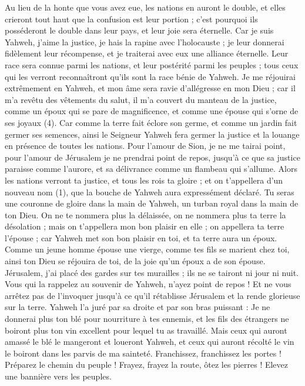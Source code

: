 \begin{multicols}{2}
Au lieu de la honte que vous avez eue, les nations en auront le double, et elles crieront tout haut que la confusion est leur portion ; c'est pourquoi ils posséderont le double dans leur pays, et leur joie sera éternelle.
Car je suis Yahweh, j’aime la justice, je hais la rapine avec l'holocauste ; je leur donnerai fidèlement leur récompense, et je traiterai avec eux une alliance éternelle.
Leur race sera connue parmi les nations, et leur postérité parmi les peuples ; tous ceux qui les verront reconnaîtront qu'ils sont la race bénie de Yahweh.
Je me réjouirai extrêmement en Yahweh, et mon âme sera ravie d’allégresse en mon Dieu ; car il m'a revêtu des vêtements du salut, il m'a couvert du manteau de la justice, comme un époux qui se pare de magnificence, et comme une épouse qui s'orne de ses joyaux (4).
Car comme la terre fait éclore son germe, et comme un jardin fait germer ses semences, ainsi le Seigneur Yahweh fera germer la justice et la louange en présence de toutes les nations.
\VerseOne{}Pour l'amour de Sion, je ne me tairai point, pour l'amour de Jérusalem je ne prendrai point de repos, jusqu’à ce que sa justice paraisse comme l’aurore, et sa délivrance comme un flambeau qui s’allume.
Alors les nations verront ta justice, et tous les rois ta gloire ; et on t'appellera d'un nouveau nom (1), que la bouche de Yahweh aura expressément déclaré.
Tu seras une couronne de gloire dans la main de Yahweh, un turban royal dans la main de ton Dieu.
On ne te nommera plus la délaissée, on ne nommera plus ta terre la désolation ; mais on t'appellera mon bon plaisir en elle ; on appellera ta terre l’épouse ; car Yahweh met son bon plaisir en toi, et ta terre aura un époux.
Comme un jeune homme épouse une vierge, comme tes fils se marient chez toi, ainsi ton Dieu se réjouira de toi, de la joie qu'un époux a de son épouse.
Jérusalem, j'ai placé des gardes sur tes murailles ; ils ne se tairont ni jour ni nuit. Vous qui la rappelez au souvenir de Yahweh, n’ayez point de repos !
Et ne vous arrêtez pas de l'invoquer jusqu’à ce qu'il rétablisse Jérusalem et la rende glorieuse sur la terre.
Yahweh l’a juré par sa droite et par son bras puissant : Je ne donnerai plus ton blé pour nourriture à tes ennemis, et les fils des étrangers ne boiront plus ton vin excellent pour lequel tu as travaillé.
Mais ceux qui auront amassé le blé le mangeront et loueront Yahweh, et ceux qui auront récolté le vin le boiront dans les parvis de ma sainteté.
Franchissez, franchissez les portes ! Préparez le chemin du peuple ! Frayez, frayez la route, ôtez les pierres ! Elevez une bannière vers les peuples.

\end{multicols}
